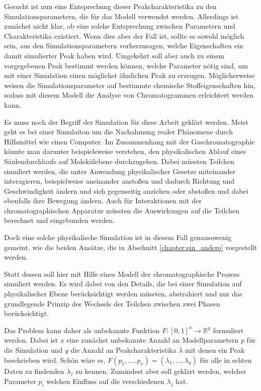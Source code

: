 Gesucht ist nun eine Entsprechung dieser Peakcharakteristika
zu den Simulationsparametern, die für das Modell verwendet werden. Allerdings ist zunächst nicht klar, ob eine solche Entsprechung zwischen Parametern und Charakteristika existiert. Wenn dies aber der Fall ist,  
sollte es sowohl möglich sein, aus den Simulationsparametern vorherzusagen, welche Eigenschaften ein damit simulierter Peak haben wird. Umgekehrt soll aber auch zu einem vorgegebenen Peak bestimmt werden können, welche Parameter nötig sind, um mit einer Simulation einen möglichst ähnlichen Peak zu erzeugen. Möglicherweise weisen die Simulationsparameter auf bestimmte chemische Stoffeigenschaften hin, sodass mit diesem Modell die Analyse von Chromatogrammen erleichtert werden kann.

Es muss noch der Begriff der Simulation für diese Arbeit geklärt werden. Meist geht es bei einer Simulaiton um die Nachahmung realer Phänomene durch Hilfsmittel wie einen Computer. Im Zusammenhang mit der Gaschromatographie könnte man darunter beispielsweise verstehen, den physikalischen Ablauf eines Säulendurchlaufs auf Molekülebene durchzugehen. Dabei müssten Teilchen simuliert werden, die unter Anwendung physikalischer Gesetze miteinander interagieren, beispielweise aneinander anstoßen und dadurch Richtung und Geschwindigkeit ändern und sich gegenseitig anziehen oder abstoßen und dabei ebenfalls ihre Bewegung ändern. Auch für Interaktionen mit der chromatographischen Apparatur müssten die Auswirkungen auf die Teilchen berechnet und eingebunden werden. 

Doch eine solche physikalische Simulation ist in diesem Fall genausowenig gemeint, wie die beiden Ansätze, die in Abschnitt \ref{chapter:ein_andere} vorgestellt werden.

Statt dessen soll hier mit Hilfe eines Modell der chromatographische Prozess simuliert werden. Es wird dabei von den Details, die bei einer Simulation auf physikalischer Ebene berücksichtigt werden müssten, abstrahiert und nur das grundlegende Prinzip des Wechsels der Teilchen zwischen zwei Phasen berücksichtigt. 

Das Problem kann daher als unbekannte Funktion $F: [0,1] ^ x \rightarrow \mathbb{R}^y$ formuliert werden. Dabei ist $x$ eine zunächst unbekannte Anzahl an Modellparametern $p$ für die Simulation und $y$ die Anzahl an Peakcharakteristika $\lambda$ mit denen ein Peak beschrieben wird. Schön wäre es, $F(p_1, \ldots, p_x) = (\lambda_1, \ldots, \lambda_y)$ für alle in echten Daten zu findenden $\lambda_j$ zu kennen. Zumindest aber soll geklärt werden, welcher Parameter $p_i$ welchen Einfluss auf die verschiedenen $\lambda_j$ hat. 

